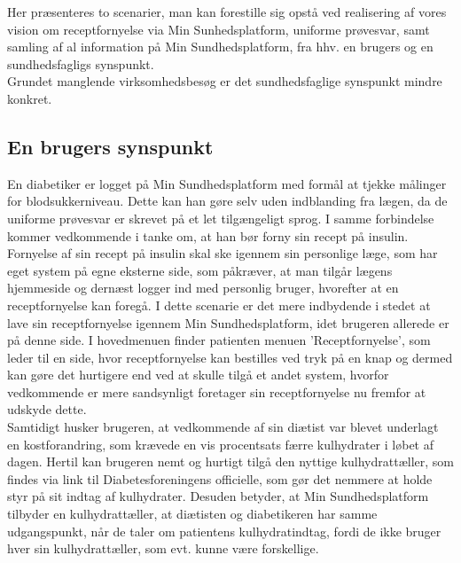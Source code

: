 Her præsenteres to scenarier, man kan forestille sig opstå ved realisering af vores vision om receptfornyelse via Min Sunhedsplatform, uniforme prøvesvar, samt samling af al information 
 på Min Sundhedsplatform, fra hhv. en brugers og en sundhedsfagligs synspunkt. \\
 Grundet manglende virksomhedsbesøg er det sundhedsfaglige synspunkt mindre konkret. 

\subsection{En brugers synspunkt}
En diabetiker er logget på Min Sundhedsplatform med formål at tjekke målinger for blodsukkerniveau. Dette kan han gøre selv uden indblanding fra lægen, da de uniforme prøvesvar er skrevet på et let tilgængeligt sprog. I samme forbindelse kommer vedkommende i tanke om, at han bør forny sin recept på insulin. Fornyelse af sin recept på insulin skal ske igennem sin personlige læge, som har eget system på egne eksterne side, som påkræver, at man tilgår lægens hjemmeside og dernæst logger ind med personlig bruger, hvorefter at en receptfornyelse kan foregå. I dette scenarie er det mere indbydende i stedet at lave sin receptfornyelse igennem Min Sundhedsplatform, idet brugeren allerede er på denne side. 
I hovedmenuen finder patienten menuen 'Receptfornyelse', som leder til en side, hvor receptfornyelse kan bestilles ved tryk på en knap og dermed kan gøre det hurtigere end ved at skulle tilgå et andet system, hvorfor vedkommende er mere sandsynligt foretager sin receptfornyelse nu fremfor at udskyde dette.\\
Samtidigt husker brugeren, at vedkommende af sin diætist var blevet underlagt en kostforandring, som krævede en vis procentsats færre kulhydrater i løbet af dagen. Hertil kan brugeren nemt og hurtigt tilgå den nyttige kulhydrattæller, som findes via link til Diabetesforeningens officielle, som gør det nemmere at holde styr på sit indtag af kulhydrater. Desuden betyder, at Min Sundhedsplatform tilbyder en kulhydrattæller, at diætisten og diabetikeren har samme udgangspunkt, når de taler om patientens kulhydratindtag, fordi de ikke bruger hver sin kulhydrattæller, som evt. kunne være forskellige. 


